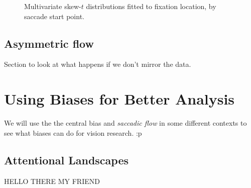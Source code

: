 \documentclass[a4paper, onecolumn, oneside, 11pt]{article}
\begin{document}
\begin{figure}
\caption{Multivariate skew-$t$ distributions fitted to fixation location, by saccade start point.}
\label{fig:exampleSkewNormal}
\end{figure}

\subsection{Asymmetric flow}

Section to look at what happens if we don't mirror the data.


\section{Using Biases for Better Analysis}

We will use the the central bias \citep{clarke-tatler2014} and \textit{saccadic flow} in some different contexts to see what biases can do for vision research. :p


\subsection{Attentional Landscapes}

HELLO THERE MY FRIEND
\end{document}
